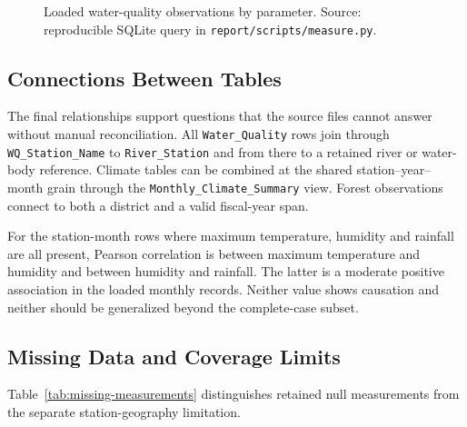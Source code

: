\begin{figure}[H]
\centering
{}
\caption{Loaded water-quality observations by parameter. Source: reproducible
SQLite query in \texttt{report/scripts/measure.py}.}
\label{fig:water-quality-parameters}
\end{figure}

\subsection{Connections Between Tables}
\label{subsec:relationship-findings}

The final relationships support questions that the source files cannot answer
without manual reconciliation. All \mWaterQualityConnected{}
\texttt{Water\_Quality} rows join through \texttt{WQ\_Station\_Name} to
\texttt{River\_Station} and from there to a retained river or water-body
reference. Climate tables can be
combined at the shared station--year--month grain through the
\texttt{Monthly\_Climate\_Summary} view. Forest observations connect to both a
district and a valid fiscal-year span.

For the \mCompleteClimateRows{} station-month rows where maximum temperature,
humidity and rainfall are all present, Pearson correlation is
\mTempHumidityCorrelation{} between maximum temperature and humidity and
\mHumidityRainfallCorrelation{} between humidity and rainfall. The latter is a
moderate positive association in the loaded monthly records. Neither value
shows causation and neither should be generalized beyond the complete-case
subset.

\subsection{Missing Data and Coverage Limits}
\label{subsec:missing-findings}

Table~\ref{tab:missing-measurements} distinguishes retained null measurements
from the separate station-geography limitation.

